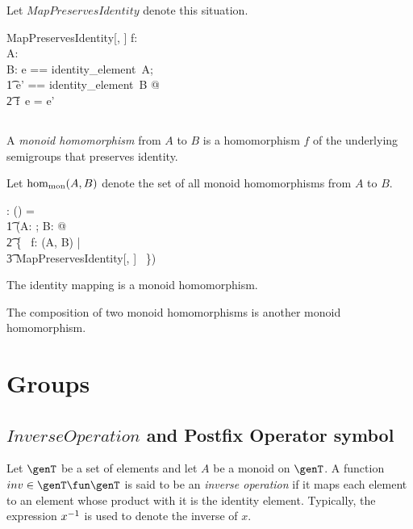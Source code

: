 \documentclass{amsart}
\begin{document}
Let $MapPreservesIdentity$ denote this situation.

\begin{schema}{MapPreservesIdentity}[\genT, \genU]
f: \genT \fun \genU \\
A: \monoid \genT \\
B: \monoid \genU
\where
\LET e == identity\_element~A; \\
\t1	e' == identity\_element~B @ \\
\t2		f~e = e'
\end{schema}

\subsection{}

A {\em monoid homomorphism} from $A$ to $B$ is a homomorphism $f$ of the underlying semigroups
that preserves identity.

Let $\operatorname{hom_{mon}}(A, B)$ denote the set of all monoid homomorphisms from $A$ to $B$.

\begin{gendef}[\genT, \genU]
\homMonoid: \monoid \genT \cross \monoid \genU \fun \power (\genT \fun \genU)
\where
\homMonoid = \\
\t1	(\lambda A: \monoid \genT; B: \monoid \genU @ \\
\t2		\{~ f: \homSemigroup(A, B) | \\
\t3			MapPreservesIdentity[\genT, \genU] ~\})
\end{gendef}

\begin{remark}
The identity mapping is a monoid homomorphism.
\end{remark}

\begin{remark}
The composition of two monoid homomorphisms is another monoid homomorphism.
\end{remark}

\section{Groups}

\subsection{$InverseOperation$ and Postfix Operator symbol }

Let $\genT$ be a set of elements and let $A$ be a monoid on $\genT$.
A function $inv \in \genT \fun \genT$ is said to be an {\em inverse operation} if it maps each element
to an element whose product with it is the identity element.
Typically, the expression $x ^{-1}$ is used to denote the inverse of $x$.
\end{document}
